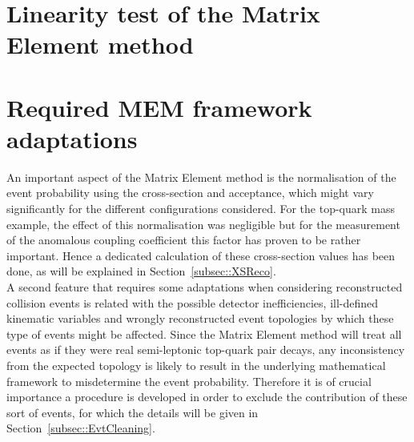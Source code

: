\section{Linearity test of the Matrix Element method}

\section{Required MEM framework adaptations} \label{sec::RecoAdapt}

An important aspect of the Matrix Element method is the normalisation of the event probability using the cross-section and acceptance, which might vary significantly for the different configurations considered. For the top-quark mass example, the effect of this normalisation was negligible but for the measurement of the anomalous coupling coefficient this factor has proven to be rather important. 
Hence a dedicated calculation of these cross-section values has been done, as will be explained in Section~\ref{subsec::XSReco}.
\\

A second feature that requires some adaptations when considering reconstructed collision events is related with the possible detector inefficiencies, ill-defined kinematic variables and wrongly reconstructed event topologies by which these type of events might be affected.
Since the Matrix Element method will treat all events as if they were real semi-leptonic top-quark pair decays, any inconsistency from the expected topology is likely to result in the underlying mathematical framework to misdetermine the event probability.
Therefore it is of crucial importance a procedure is developed in order to exclude the contribution of these sort of events, for which the details will be given in Section~\ref{subsec::EvtCleaning}.

